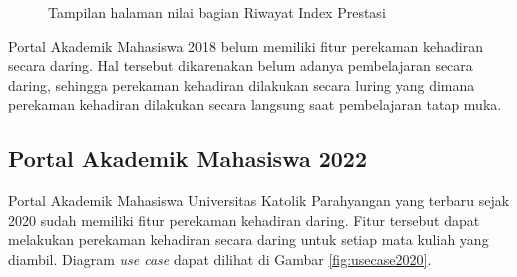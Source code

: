 \begin{enumerate}
\begin{figure}[H]
		\caption{Tampilan halaman nilai bagian Riwayat Index Prestasi} 
		\label{fig:rip_2018}
	\end{figure}
\end{enumerate}
Portal Akademik Mahasiswa 2018 belum memiliki fitur perekaman kehadiran secara daring. Hal tersebut dikarenakan belum adanya pembelajaran secara daring, sehingga perekaman kehadiran dilakukan secara luring yang dimana perekaman kehadiran dilakukan secara langsung saat pembelajaran tatap muka.

\subsection{Portal Akademik Mahasiswa 2022}
\label{sec:alur} 
Portal Akademik Mahasiswa Universitas Katolik Parahyangan yang terbaru sejak 2020 sudah memiliki fitur perekaman kehadiran daring. Fitur tersebut dapat melakukan perekaman kehadiran secara daring untuk setiap mata kuliah yang diambil. Diagram \textit{use case} dapat dilihat di Gambar \ref{fig:usecase2020}.

